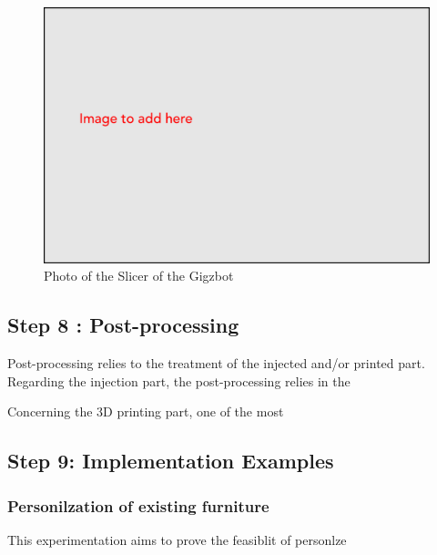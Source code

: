 \documentclass[
  11pt,
]{article}
\begin{document}
\begin{figure}[H]

{\centering \includegraphics[width=5.20833in,height=\textheight]{figures/Image-to-add.png}

}

\caption{Photo of the Slicer of the Gigzbot}

\end{figure}

\hypertarget{step-8-post-processing}{%
\subsection{Step 8 : Post-processing}\label{step-8-post-processing}}

Post-processing relies to the treatment of the injected and/or printed
part. Regarding the injection part, the post-processing relies in the

Concerning the 3D printing part, one of the most

\hypertarget{step-9-implementation-examples}{%
\subsection{Step 9: Implementation
Examples}\label{step-9-implementation-examples}}

\hypertarget{personilzation-of-existing-furniture}{%
\subsubsection{Personilzation of existing
furniture}\label{personilzation-of-existing-furniture}}

This experimentation aims to prove the feasiblit of personlze
\end{document}
